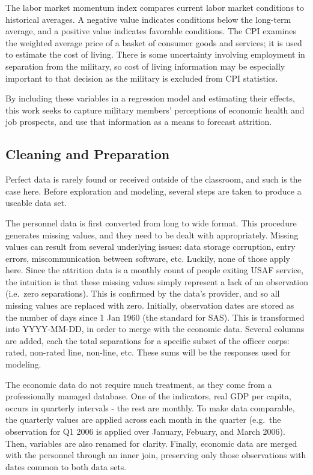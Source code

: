 \documentclass[12pt,letterpaper,toc=flat,oneside]{report}
\theoremstyle{definition}
\theoremstyle{definition}
\theoremstyle{definition}
\theoremstyle{remark}
\begin{document}
The labor market momentum index compares current labor market conditions
to historical averages. A negative value indicates conditions below the
long-term average, and a positive value indicates favorable conditions.
The CPI examines the weighted average price of a basket of consumer
goods and services; it is used to estimate the cost of living. There is
some uncertainty involving employment in separation from the military,
so cost of living information may be especially important to that
decision as the military is excluded from CPI statistics.

By including these variables in a regression model and estimating their
effects, this work seeks to capture military members' perceptions of
economic health and job prospects, and use that information as a means
to forecast attrition.

\hypertarget{cleaning-and-preparation}{%
\subsection{Cleaning and Preparation}\label{cleaning-and-preparation}}

Perfect data is rarely found or received outside of the classroom, and
such is the case here. Before exploration and modeling, several steps
are taken to produce a useable data set.

The personnel data is first converted from long to wide format. This
procedure generates missing values, and they need to be dealt with
appropriately. Missing values can result from several underlying issues:
data storage corruption, entry errors, miscommunication between
software, etc. Luckily, none of those apply here. Since the attrition
data is a monthly count of people exiting USAF service, the intuition is
that these missing values simply represent a lack of an observation
(i.e.~zero separations). This is confirmed by the data's provider, and
so all missing values are replaced with zero. Initially, observation
dates are stored as the number of days since 1 Jan 1960 (the standard
for SAS). This is transformed into YYYY-MM-DD, in order to merge with
the economic data. Several columns are added, each the total separations
for a specific subset of the officer corps: rated, non-rated line,
non-line, etc. These sums will be the responses used for modeling.

The economic data do not require much treatment, as they come from a
professionally managed database. One of the indicators, real GDP per
capita, occurs in quarterly intervals - the rest are monthly. To make
data comparable, the quarterly values are applied across each month in
the quarter (e.g.~the observation for Q1 2006 is applied over January,
Febuary, and March 2006). Then, variables are also renamed for clarity.
Finally, economic data are merged with the personnel through an inner
join, preserving only those observations with dates common to both data
sets.
\end{document}
